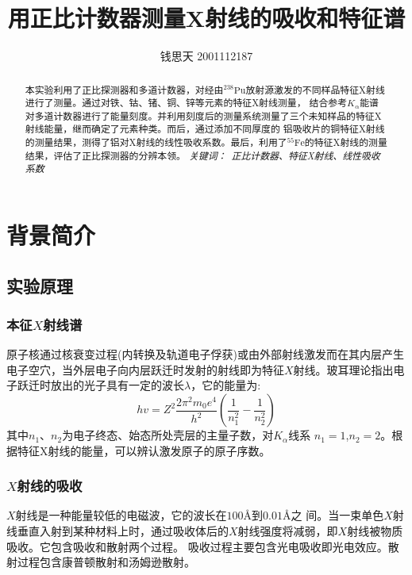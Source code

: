\documentclass{article}
\title{用正比计数器测量X射线的吸收和特征谱}
\author{钱思天 2001112187}
\begin{document}
    \maketitle
    \begin{abstract}
        本实验利用了正比探测器和多道计数器，对经由$^{238}\text{Pu}$放射源激发的不同样品特征X射线进行了测量。通过对铁、钴、锗、铜、锌等元素的特征X射线测量，
        结合参考$K_\alpha$能谱对多道计数器进行了能量刻度。并利用刻度后的测量系统测量了三个未知样品的特征X射线能量，继而确定了元素种类。而后，通过添加不同厚度的
        铝吸收片的铜特征X射线的测量结果，测得了铝对X射线的线性吸收系数。最后，利用了$^{55}\text{Fe}$的特征X射线的测量结果，评估了正比探测器的分辨本领。
        \newline
        \newline
        {\emph{ 关键词：\ 正比计数器、特征X射线、线性吸收系数 }\rm}

    \end{abstract}

    \section{背景简介}
    \subsection{实验原理}
    \subsubsection{本征$X$射线谱}
    原子核通过核衰变过程(内转换及轨道电子俘获)或由外部射线激发而在其内层产生电子空穴，当外层电子向内层跃迁时发射的射线即为特征$X$射线。玻耳理论指出电子跃迁时放出的光子具有一定的波长$\lambda$，它的能量为:
    \begin{equation}
        h v=Z^{2} \frac{2 \pi^{2} m_{0} e^{4}}{h^{2}}\left(\frac{1}{n_{1}^{2}}-\frac{1}{n_{2}^{2}}\right)
    \end{equation}
其中$n_1$、$n_2$为电子终态、始态所处壳层的主量子数，对$K_\alpha$线系
$n_1=1$,$n_2=2$。根据特征X射线的能量，可以辨认激发原子的原子序数。
    \subsubsection{$X$射线的吸收}
    $X$射线是一种能量较低的电磁波，它的波长在$100\text{\AA}$到$0.01\text{\AA}$之
间。当一束单色$X$射线垂直入射到某种材料上时，通过吸收体后的$X$射线强度将减弱，即$X$射线被物质吸收。它包含吸收和散射两个过程。
吸收过程主要包含光电吸收即光电效应。散射过程包含康普顿散射和汤姆逊散射。
\end{document}
